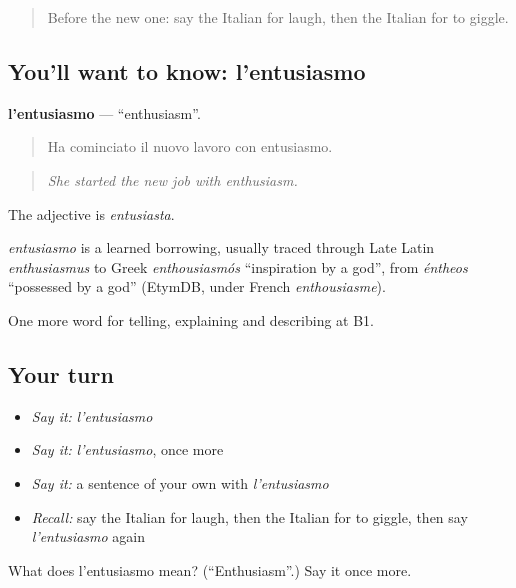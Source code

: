 \begin{quote}
Before the new one: say the Italian for laugh, then the Italian for to giggle.
\end{quote}

\subsection*{You'll want to know: l'entusiasmo}
\textbf{l'entusiasmo} — \textquotedblleft{}enthusiasm\textquotedblright{}.

\begin{quote}
Ha cominciato il nuovo lavoro con entusiasmo.
\end{quote}

\begin{quote}
\emph{She started the new job with enthusiasm.}
\end{quote}

The adjective is \emph{entusiasta}.

\begin{cousinweb}
\emph{entusiasmo} is a learned borrowing, usually traced through Late Latin \emph{enthusiasmus} to Greek \emph{enthousiasmós} \textquotedblleft{}inspiration by a god\textquotedblright{}, from \emph{éntheos} \textquotedblleft{}possessed by a god\textquotedblright{} (EtymDB, under French \emph{enthousiasme}).
\end{cousinweb}

\begin{grammarlens}[title={What you've built}]
One more word for telling, explaining and describing at B1.
\end{grammarlens}

\subsection*{Your turn}
\begin{itemize}
\raggedright
  \item \emph{Say it:} \emph{l'entusiasmo}
  \item \emph{Say it:} \emph{l'entusiasmo}, once more
  \item \emph{Say it:} a sentence of your own with \emph{l'entusiasmo}
  \item \emph{Recall:} say the Italian for laugh, then the Italian for to giggle, then say \emph{l'entusiasmo} again
\end{itemize}

\begin{tcolorbox}[breakable,colback=teal!4,colframe=teal!35!black,title={Before you move on}]
What does l'entusiasmo mean? (\textquotedblleft{}Enthusiasm\textquotedblright{}.) Say it once more.
\end{tcolorbox}
